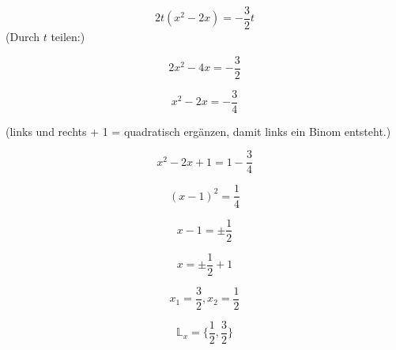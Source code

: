 



\usepackage{cancel}
\renewcommand{\metaHeaderLine}{Musterloesung}
\renewcommand{\arbeitsblattTitel}{Marthaler S. 181 Aufg. 7. e)}

\arbeitsblattHeader{}

$$2t(x^2-2x)=-\frac{3}{2}t$$
(Durch $t$ teilen:)

$$2x^2-4x=-\frac{3}{2}$$

$$x^2-2x=-\frac{3}{4} $$

(links und rechts + 1 = quadratisch ergänzen, damit links ein Binom entsteht.)

$$x^2-2x+1 = 1 -\frac{3}{4}$$

$$(x-1)^2=\frac{1}{4}$$

$$x-1 = \pm \frac{1}{2}$$

$$x=\pm \frac{1}{2}+ 1 $$

$$x_1 = \frac{3}{2}, x_2 = \frac{1}{2}  $$

$$\mathbb{L}_x = \{\frac{1}{2}, \frac{3}{2}\}$$

